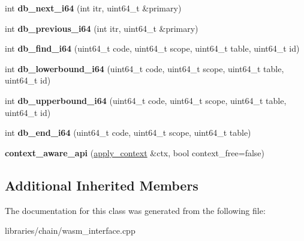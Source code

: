 \begin{DoxyCompactItemize}
int {\bfseries db\+\_\+next\+\_\+i64} (int itr, uint64\+\_\+t \&primary)
\item 
\mbox{\label{classaacio_1_1chain_1_1database__api_addb2fe60abc7ae25eef9eda2a6d32619}} 
int {\bfseries db\+\_\+previous\+\_\+i64} (int itr, uint64\+\_\+t \&primary)
\item 
\mbox{\label{classaacio_1_1chain_1_1database__api_ada8d7e8e22dc6045f6a5a33d787cc20d}} 
int {\bfseries db\+\_\+find\+\_\+i64} (uint64\+\_\+t code, uint64\+\_\+t scope, uint64\+\_\+t table, uint64\+\_\+t id)
\item 
\mbox{\label{classaacio_1_1chain_1_1database__api_a6d05659b80403279caa35903aa00385e}} 
int {\bfseries db\+\_\+lowerbound\+\_\+i64} (uint64\+\_\+t code, uint64\+\_\+t scope, uint64\+\_\+t table, uint64\+\_\+t id)
\item 
\mbox{\label{classaacio_1_1chain_1_1database__api_af3bc714529101f2b2b71afc17acecf7d}} 
int {\bfseries db\+\_\+upperbound\+\_\+i64} (uint64\+\_\+t code, uint64\+\_\+t scope, uint64\+\_\+t table, uint64\+\_\+t id)
\item 
\mbox{\label{classaacio_1_1chain_1_1database__api_a96c9e29f4b5dbedc6cdd5eead45287c6}} 
int {\bfseries db\+\_\+end\+\_\+i64} (uint64\+\_\+t code, uint64\+\_\+t scope, uint64\+\_\+t table)
\item 
\mbox{\label{classaacio_1_1chain_1_1database__api_ad2711b0a72fe3f1b0b1512c97e16d285}} 
{\bfseries context\+\_\+aware\+\_\+api} (\mbox{\hyperlink{classaacio_1_1chain_1_1apply__context}{apply\+\_\+context}} \&ctx, bool context\+\_\+free=false)
\end{DoxyCompactItemize}
\subsection*{Additional Inherited Members}


The documentation for this class was generated from the following file\+:\begin{DoxyCompactItemize}
\item 
libraries/chain/wasm\+\_\+interface.\+cpp\end{DoxyCompactItemize}
